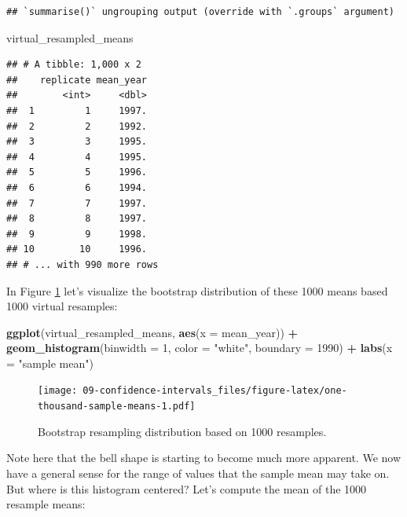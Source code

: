 \documentclass[
]{book}
\newenvironment{Shaded}{\begin{snugshade}}{\end{snugshade}}
\newcommand{\DataTypeTok}[1]{\textcolor[rgb]{0.13,0.29,0.53}{#1}}
\newcommand{\DecValTok}[1]{\textcolor[rgb]{0.00,0.00,0.81}{#1}}
\newcommand{\KeywordTok}[1]{\textcolor[rgb]{0.13,0.29,0.53}{\textbf{#1}}}
\newcommand{\NormalTok}[1]{#1}
\newcommand{\OperatorTok}[1]{\textcolor[rgb]{0.81,0.36,0.00}{\textbf{#1}}}
\newcommand{\StringTok}[1]{\textcolor[rgb]{0.31,0.60,0.02}{#1}}
\begin{document}
\begin{verbatim}
## `summarise()` ungrouping output (override with `.groups` argument)
\end{verbatim}

\begin{Shaded}
\begin{Highlighting}[]
\NormalTok{virtual_resampled_means}
\end{Highlighting}
\end{Shaded}

\begin{verbatim}
## # A tibble: 1,000 x 2
##    replicate mean_year
##        <int>     <dbl>
##  1         1     1997.
##  2         2     1992.
##  3         3     1995.
##  4         4     1995.
##  5         5     1996.
##  6         6     1994.
##  7         7     1997.
##  8         8     1997.
##  9         9     1998.
## 10        10     1996.
## # ... with 990 more rows
\end{verbatim}

In Figure \ref{fig:one-thousand-sample-means} let's visualize the bootstrap distribution of these 1000 means based 1000 virtual resamples:

\begin{Shaded}
\begin{Highlighting}[]
\KeywordTok{ggplot}\NormalTok{(virtual_resampled_means, }\KeywordTok{aes}\NormalTok{(}\DataTypeTok{x =}\NormalTok{ mean_year)) }\OperatorTok{+}
\StringTok{  }\KeywordTok{geom_histogram}\NormalTok{(}\DataTypeTok{binwidth =} \DecValTok{1}\NormalTok{, }\DataTypeTok{color =} \StringTok{"white"}\NormalTok{, }\DataTypeTok{boundary =} \DecValTok{1990}\NormalTok{) }\OperatorTok{+}
\StringTok{  }\KeywordTok{labs}\NormalTok{(}\DataTypeTok{x =} \StringTok{"sample mean"}\NormalTok{)}
\end{Highlighting}
\end{Shaded}

\begin{figure}
\centering
\texttt{[image: 09-confidence-intervals\_files/figure-latex/one-thousand-sample-means-1.pdf]}
\caption{\label{fig:one-thousand-sample-means}Bootstrap resampling distribution based on 1000 resamples.}
\end{figure}

Note here that the bell shape is starting to become much more apparent. We now have a general sense for the range of values that the sample mean may take on. But where is this histogram centered? Let's compute the mean of the 1000 resample means:
\end{document}
